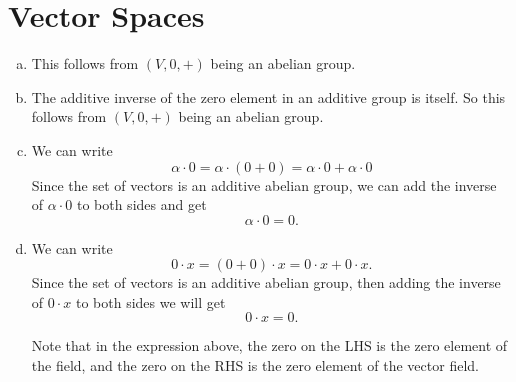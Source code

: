 \section{Vector Spaces}
\begin{problem}
	\begin{solution}
		\begin{enumerate}[(a)]
			\item This follows from $ (V,0,+) $ being an abelian group.
			\item The additive inverse of the zero element in an additive group is itself. So this follows from $ (V,0,+) $ being an abelian group.
			\item We can write
			\[ \alpha\cdot0 = \alpha\cdot(0 + 0) = \alpha\cdot 0 + \alpha\cdot 0 \]
			Since the set of vectors is an additive abelian group, we can add the inverse of $ \alpha\cdot 0 $ to both sides and get
			\[ \alpha\cdot 0 = 0. \]
			\item We can write
			\[ 0\cdot x = (0+0)\cdot x = 0\cdot x + 0\cdot x. \]
			Since the set of vectors is an additive abelian group, then adding the inverse of $ 0\cdot x $ to both sides we will get
			\[ 0\cdot x = 0. \]
			\begin{remark}
				Note that in the expression above, the zero on the LHS is the zero element of the field, and the zero on the RHS is the zero element of the vector field. 
			\end{remark}
 		\end{enumerate}
	\end{solution}
\end{problem}